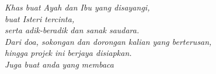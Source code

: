 \begin{dedication}
\emph{Khas buat Ayah dan Ibu yang disayangi,
\\buat Isteri tercinta,
\\serta adik-beradik dan sanak saudara.
\\Dari doa, sokongan dan dorongan kalian yang berterusan,
\\hingga projek ini berjaya disiapkan.\linebreak
\\Juga buat anda yang membaca}%
\end{dedication}
